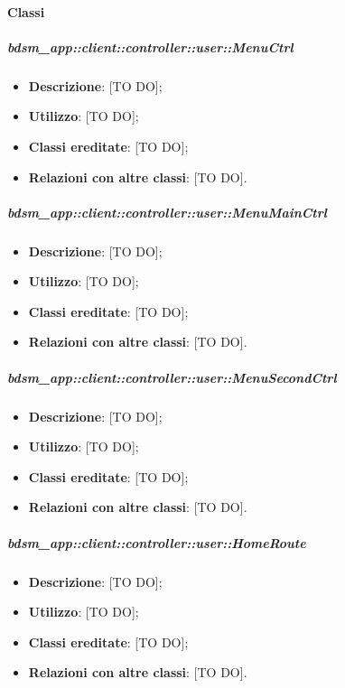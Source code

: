 	\paragraph{Classi} %
		\subparagraph{bdsm\_app::client::controller::user::MenuCtrl} %
		\label{subp:client_controller_user_menuctrl}
			\begin{itemize}
				\item \textbf{Descrizione}: [TO DO];
				\item \textbf{Utilizzo}: [TO DO];
				\item \textbf{Classi ereditate}: [TO DO];
				\item \textbf{Relazioni con altre classi}: [TO DO].
			\end{itemize}

		\subparagraph{bdsm\_app::client::controller::user::MenuMainCtrl} %
		\label{subp:client_controller_user_menumainctrl}
			\begin{itemize}
				\item \textbf{Descrizione}: [TO DO];
				\item \textbf{Utilizzo}: [TO DO];
				\item \textbf{Classi ereditate}: [TO DO];
				\item \textbf{Relazioni con altre classi}: [TO DO].
			\end{itemize}

		\subparagraph{bdsm\_app::client::controller::user::MenuSecondCtrl} %
		\label{subp:client_controller_user_menusecondctrl}
			\begin{itemize}
				\item \textbf{Descrizione}: [TO DO];
				\item \textbf{Utilizzo}: [TO DO];
				\item \textbf{Classi ereditate}: [TO DO];
				\item \textbf{Relazioni con altre classi}: [TO DO].
			\end{itemize}

		\subparagraph{bdsm\_app::client::controller::user::HomeRoute} %
		\label{subp:bdsm_app_client_controller_user_homerouteconfig}
			\begin{itemize}
				\item \textbf{Descrizione}: [TO DO];
				\item \textbf{Utilizzo}: [TO DO];
				\item \textbf{Classi ereditate}: [TO DO];
				\item \textbf{Relazioni con altre classi}: [TO DO].
			\end{itemize}

